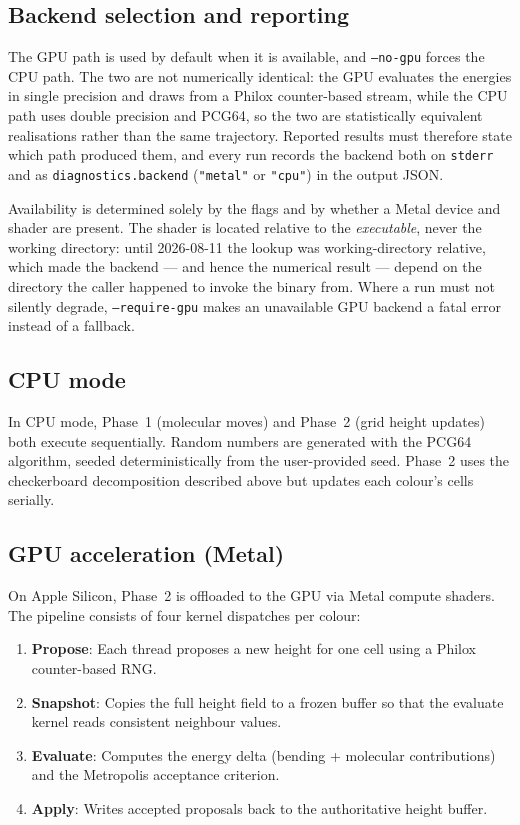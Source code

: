 \documentclass[11pt,a4paper]{article}
\begin{document}
\subsection{Backend selection and reporting}

The GPU path is used by default when it is available, and
\texttt{--no-gpu} forces the CPU path.  The two are not numerically
identical: the GPU evaluates the energies in single precision and draws
from a Philox counter-based stream, while the CPU path uses double
precision and PCG64, so the two are statistically equivalent
realisations rather than the same trajectory.  Reported results must
therefore state which path produced them, and every run records the
backend both on \texttt{stderr} and as \texttt{diagnostics.backend}
(\texttt{"metal"} or \texttt{"cpu"}) in the output JSON.

Availability is determined solely by the flags and by whether a Metal
device and shader are present.  The shader is located relative to the
\emph{executable}, never the working directory: until 2026-08-11 the
lookup was working-directory relative, which made the backend --- and
hence the numerical result --- depend on the directory the caller
happened to invoke the binary from.  Where a run must not silently
degrade, \texttt{--require-gpu} makes an unavailable GPU backend a
fatal error instead of a fallback.

\subsection{CPU mode}

In CPU mode, Phase~1 (molecular moves) and Phase~2 (grid height
updates) both execute sequentially.  Random numbers are generated with
the PCG64 algorithm, seeded deterministically from the user-provided
seed.  Phase~2 uses the checkerboard decomposition described above but
updates each colour's cells serially.

\subsection{GPU acceleration (Metal)}

On Apple Silicon, Phase~2 is offloaded to the GPU via Metal compute
shaders.  The pipeline consists of four kernel dispatches per colour:

\begin{enumerate}
  \item \textbf{Propose}: Each thread proposes a new height for one
    cell using a Philox counter-based RNG.
  \item \textbf{Snapshot}: Copies the full height field to a frozen
    buffer so that the evaluate kernel reads consistent neighbour
    values.
  \item \textbf{Evaluate}: Computes the energy delta (bending +
    molecular contributions) and the Metropolis acceptance criterion.
  \item \textbf{Apply}: Writes accepted proposals back to the
    authoritative height buffer.
\end{enumerate}
\end{document}
